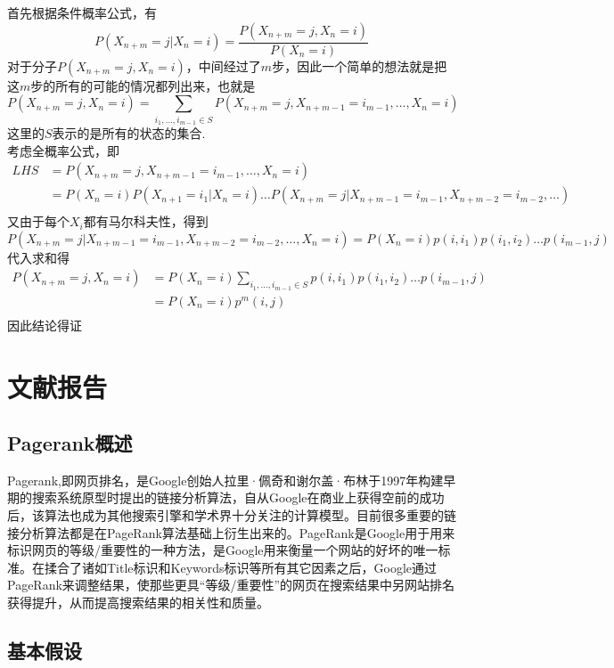 \documentclass{article}
\begin{document}
首先根据条件概率公式，有
\[P(X_{n+m}=j|X_n=i) = \frac{P(X_{n+m}=j,X_n=i)}{P(X_n=i)}\]
对于分子$P(X_{n+m}=j,X_n=i)$，中间经过了$m$步，因此一个简单的想法就是把这$m$步的所有的可能的情况都列出来，也就是
\[P(X_{n+m}=j,X_n=i) = \sum\limits_{i_1,\dots,i_{m-1}\in S}P(X_{n+m}=j,X_{n+m-1}=i_{m-1},\dots,X_n=i)\]
这里的$S$表示的是所有的状态的集合.\\
考虑全概率公式，即
\[\]
\begin{equation*}
\begin{split}
LHS
&= P(X_{n+m}=j,X_{n+m-1}=i_{m-1},\dots,X_n=i) \\
 &= P(X_n=i) P(X_{n+1}=i_1|X_n=i) \dots P(X_{n+m}=j|X_{n+m-1}=i_{m-1},X_{n+m-2}=i_{m-2},\dots) \\
\end{split}
\end{equation*}
又由于每个$X_i$都有马尔科夫性，得到
\[P(X_{n+m}=j|X_{n+m-1}=i_{m-1},X_{n+m-2}=i_{m-2},\dots,X_n = i)=P(X_n=i)p(i,i_1)p(i_1,i_2)\dots p(i_{m-1},j) \]
代入求和得
\begin{equation*}
\begin{split}
P(X_{n+m}=j,X_n=i)
&= P(X_n=i)\sum\limits_{i_1,\dots,i_{m-1}\in S}p(i,i_1)p(i_1,i_2)\dots p(i_{m-1},j) \\
 &= P(X_n=i)p^m(i,j) \\
\end{split}
\end{equation*}
因此结论得证

\section{文献报告}

\subsection{Pagerank概述}

Pagerank,即网页排名，是Google创始人拉里·佩奇和谢尔盖·布林于1997年构建早期的搜索系统原型时提出的链接分析算法，自从Google在商业上获得空前的成功后，该算法也成为其他搜索引擎和学术界十分关注的计算模型。目前很多重要的链接分析算法都是在PageRank算法基础上衍生出来的。PageRank是Google用于用来标识网页的等级/重要性的一种方法，是Google用来衡量一个网站的好坏的唯一标准。在揉合了诸如Title标识和Keywords标识等所有其它因素之后，Google通过PageRank来调整结果，使那些更具“等级/重要性”的网页在搜索结果中另网站排名获得提升，从而提高搜索结果的相关性和质量。

\subsection{基本假设}
\end{document}
